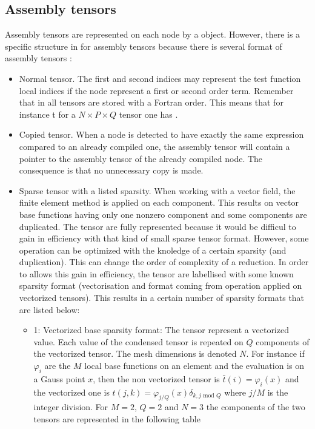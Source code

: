 \documentclass[a4paper,11pt,english]{sphinxmanual}
\begin{document}
\subsection{Assembly tensors}
\label{\detokenize{project/libdesc_high_gen_assemb:assembly-tensors}}
Assembly tensors are represented on each node by a  object. However, there is a specific structure in  for assembly tensors because there is several format of assembly tensors :
\begin{itemize}
\item {} 
Normal tensor. The first and second indices may represent the test function local indices if the node represent a first or second order term. Remember that in  all tensors are stored with a Fortran order. This means that for instance t for a \(N\times P\times Q\) tensor one has .

\item {} 
Copied tensor. When a node is detected to have exactly the same expression compared to an already compiled one, the assembly tensor will contain a pointer to the assembly tensor of the already compiled node. The consequence is that no unnecessary copy is made.

\item {} 
Sparse tensor with a listed sparsity. When working with a vector field, the finite element method is applied on each component. This results on vector base functions having only one nonzero component and some components are duplicated. The tensor are fully represented because it would be difficul to gain in efficiency with that kind of small sparse tensor format. However, some operation can be optimized with the knoledge of a certain sparsity (and duplication). This can change the order of complexity of a reduction. In order to allows this gain in efficiency, the tensor are labellised with some known sparsity format (vectorisation and format coming from operation applied on vectorized tensors). This results in a certain number of sparsity formats that are listed below:
\begin{itemize}
\item {} 
1: Vectorized base sparsity format: The tensor represent a vectorized
value. Each value of the condensed tensor is repeated on \(Q\)
components of the vectorized tensor. The mesh dimensions is denoted
\(N\). For instance if \(\varphi_i\) are the \(M\) local
base functions on an element and the evaluation is on a Gauss point
\(x\), then the non vectorized tensor is
\(\bar{t}(i) = \varphi_i(x)\) and the vectorized one is
\(t(j,k) = \varphi_{j/Q}(x) \delta_{k, j \mbox{ mod } Q}\)
where \(j/M\) is the integer division. For \(M=2\),
\(Q=2\) and \(N=3\) the components of the two tensors are
represented in the following table



\end{itemize}
\end{itemize}
\end{document}
